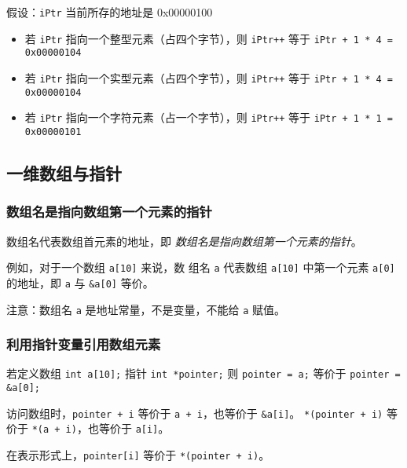 \documentclass[UTF8]{ctexart}
\begin{document}
假设：\texttt{iPtr} 当前所存的地址是 0x00000100
\begin{itemize}
    \item 若 \texttt{iPtr} 指向一个整型元素（占四个字节），则 \texttt{iPtr++} 等于
    \texttt{iPtr + 1 * 4 = 0x00000104}
    \item 若 \texttt{iPtr} 指向一个实型元素（占四个字节），则 \texttt{iPtr++} 等于
    \texttt{iPtr + 1 * 4 = 0x00000104}
    \item 若 \texttt{iPtr} 指向一个字符元素（占一个字节），则 \texttt{iPtr++} 等于
    \texttt{iPtr + 1 * 1 = 0x00000101}
\end{itemize}

\subsection{一维数组与指针}
\subsubsection{数组名是指向数组第一个元素的指针}
数组名代表数组首元素的地址，即 \emph{数组名是指向数组第一个元素的指针}。

例如，对于一个数组 \texttt{a[10]} 来说，数
组名 \texttt{a} 代表数组 \texttt{a[10]} 中第一个元素 \texttt{a[0]} 的地址，即 \texttt{a} 与 \texttt{\&a[0]}
等价。

注意：数组名 \texttt{a} 是地址常量，不是变量，不能给 \texttt{a} 赋值。

\subsubsection{利用指针变量引用数组元素}
若定义数组 \texttt{int a[10];} 指针 \texttt{int *pointer;}
则 \texttt{pointer = a;} 等价于 \texttt{pointer = &a[0];}

访问数组时，\texttt{pointer + i} 等价于 \texttt{a + i}，也等价于 \texttt{&a[i]}。
\texttt{*(pointer + i)} 等价于 \texttt{*(a + i)}，也等价于 \texttt{a[i]}。

在表示形式上，\texttt{pointer[i]} 等价于 \texttt{*(pointer + i)}。
\end{document}

